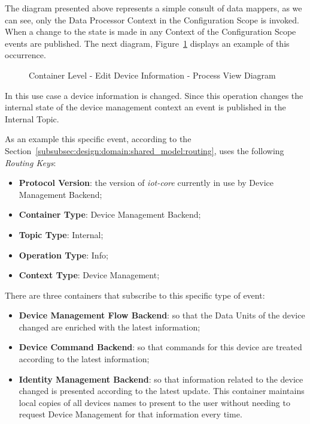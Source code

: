 The diagram presented above represents a simple consult of data mappers, as we can see, only the Data Processor Context in the Configuration Scope is invoked. When a change to the state is made in any Context of the Configuration Scope events are published. The next diagram, Figure~\ref{fig:design:architecture:container:process:diagram:device} displays an example of this occurrence.

\begin{figure}[H]
   \centering
   \resizebox{\columnwidth}{!}
   {      
      
   }
   \caption[Container Level - Edit Device Information - Process View Diagram]{Container Level - Edit Device Information - Process View Diagram}
   \label{fig:design:architecture:container:process:diagram:device}
\end{figure}

In this use case a device information is changed. Since this operation changes the internal state of the device management context an event is published in the Internal Topic.

As an example this specific event, according to the Section~\ref{subsubsec:design:domain:shared_model:routing}, uses the following \textit{Routing Keys}:

\begin{itemize}
   \item \textbf{Protocol Version}: the version of \textit{iot-core} currently in use by Device Management Backend;
   \item \textbf{Container Type}: Device Management Backend;
   \item \textbf{Topic Type}: Internal;
   \item \textbf{Operation Type}: Info;
   \item \textbf{Context Type}: Device Management;
\end{itemize}

There are three containers that subscribe to this specific type of event:

\begin{itemize}
   \item \textbf{Device Management Flow Backend}: so that the Data Units of the device changed are enriched with the latest information;
   \item \textbf{Device Command Backend}: so that commands for this device are treated according to the latest information;
   \item \textbf{Identity Management Backend}: so that information related to the device changed is presented according to the latest update. This container maintains local copies of all devices names to present to the user without needing to request Device Management for that information every time.
\end{itemize}


